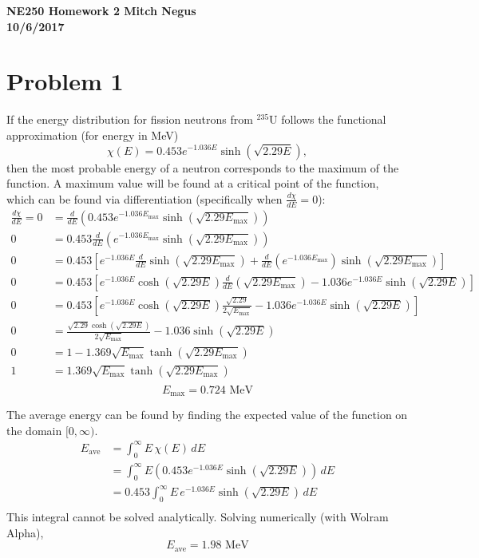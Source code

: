 \documentclass{article}
\begin{document}
\thispagestyle{empty}

{\bf {\large {NE250 Homework {2} \hfill Mitch Negus\\
		\hspace*{\fill} 10/6/2017\\ }}}
		

\section*{Problem 1}

If the energy distribution for fission neutrons from $^{235}\text{U}$ follows the functional approximation (for energy in MeV)
$$ \chi(E) = 0.453e^{-1.036E}\sinh(\sqrt{2.29E}), $$
then the most probable energy of a neutron corresponds to the maximum of the function. A maximum value will be found at a critical point of the function, which can be found via differentiation (specifically when $\frac{d\chi}{dE} = 0$):
\begin{align*}
\frac{d\chi}{dE}= 0	&= \frac{d}{dE}\left(0.453e^{-1.036E_{\text{max}}}\sinh(\sqrt{2.29E_{\text{max}}})\right) \\
				  0	&= 0.453\frac{d}{dE}\left(e^{-1.036E_{\text{max}}}\sinh(\sqrt{2.29E_{\text{max}}})\right) \\
				  0	&= 0.453\left[e^{-1.036E}\frac{d}{dE}\sinh(\sqrt{2.29E_{\text{max}}})+\frac{d}{dE}\left(e^{-1.036E_{\text{max}}}\right)\sinh(\sqrt{2.29E_{\text{max}}})\right] \\
				  0	&= 0.453\left[e^{-1.036E}\cosh(\sqrt{2.29E})\frac{d}{dE}\left(\sqrt{2.29E_{\text{max}}}\right)-1.036e^{-1.036E}\sinh(\sqrt{2.29E})\right] \\
				  0	&= 0.453\left[e^{-1.036E}\cosh(\sqrt{2.29E})\frac{\sqrt{2.29}}{2\sqrt{E_{\text{max}}}}-1.036e^{-1.036E}\sinh(\sqrt{2.29E})\right] \\
				  0	&= \frac{\sqrt{2.29}\cosh(\sqrt{2.29E})}{2\sqrt{E_{\text{max}}}}-1.036\sinh(\sqrt{2.29E}) \\
				  0	&= 1 - 1.369\sqrt{E_{\text{max}}}\tanh(\sqrt{2.29E_{\text{max}}}) \\
				  1	&= 1.369\sqrt{E_{\text{max}}}\tanh(\sqrt{2.29E_{\text{max}}}) \\
\end{align*}
$$\boxed{ E_{\text{max}}= 0.724\text{ MeV} }$$

The average energy can be found by finding the expected value of the function on the domain $[0,\infty)$.
\begin{align*}
E_{\text{ave}}	&= \int_0^{\infty} E\,\chi(E)\,dE \\
				&= \int_0^{\infty} E\left(0.453e^{-1.036E}\sinh(\sqrt{2.29E})\right)\,dE \\
				&= 0.453\int_0^{\infty} E\,e^{-1.036E}\sinh(\sqrt{2.29E})\,dE \\
\end{align*}
This integral cannot be solved analytically. Solving numerically (with Wolram Alpha),
$$\boxed{ E_{\text{ave}} = 1.98\text{ MeV} }$$
\end{document}
